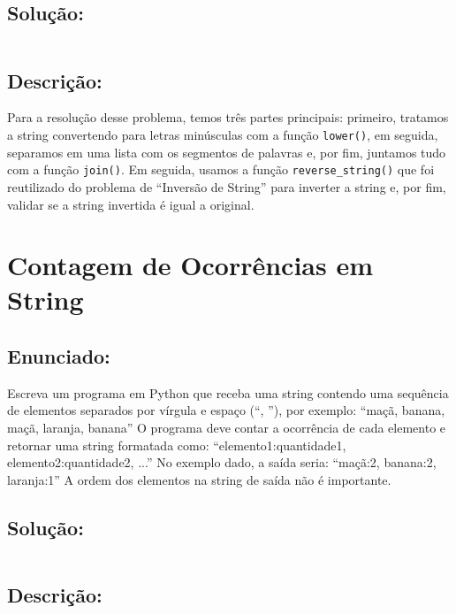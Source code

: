 \documentclass[9pt,a4paper,twocolumn,twoside]{tau-class/tau}
\begin{document}
    \subsection{Solução:}

        \inputminted{python}{src/8/8.py}

    \subsection{Descrição:}

        Para a resolução desse problema, temos três partes principais: primeiro, tratamos a string convertendo para letras minúsculas com a função \texttt{lower()}, em seguida, separamos em uma lista com os segmentos de palavras e, por fim, juntamos tudo com a função \texttt{join()}. Em seguida, usamos a função \texttt{reverse\_string()} que foi reutilizado do problema de ``Inversão de String'' para inverter a string e, por fim, validar se a string invertida é igual a original.
		
\section{Contagem de Ocorrências em String}

    \subsection{Enunciado:}
	
        \begin{tauenv}[frametitle = Contagem de Ocorrências em String.]
                Escreva um programa em Python que receba uma string contendo uma sequência de elementos separados por vírgula e espaço (``, ''), por exemplo: ``maçã, banana, maçã, laranja, banana''
                O programa deve contar a ocorrência de cada elemento e retornar uma string formatada como:
                ``elemento1:quantidade1, elemento2:quantidade2, ...'' No exemplo dado, a saída seria: ``maçã:2, banana:2, laranja:1'' A ordem dos elementos na string de saída não é importante.
        \end{tauenv}

    \subsection{Solução:}

        \inputminted{python}{src/9/9.py}

    \subsection{Descrição:}
\end{document}
